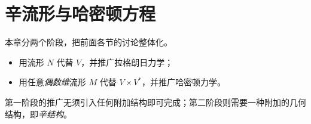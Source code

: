 \chapter{辛流形与哈密顿方程}
\label{ch:symplectic-manifolds}

本章分两个阶段，把前面各节的讨论整体化。

\begin{itemize}
  \item 用流形 $N$ 代替 $V$，并推广拉格朗日力学；
  \item 用任意\emph{偶数维}流形 $M$ 代替 $V\times V^*$，并推广哈密顿力学。
\end{itemize}

第一阶段的推广无须引入任何附加结构即可完成；第二阶段则需要一种附加的几何结构，即\emph{辛结构}。







